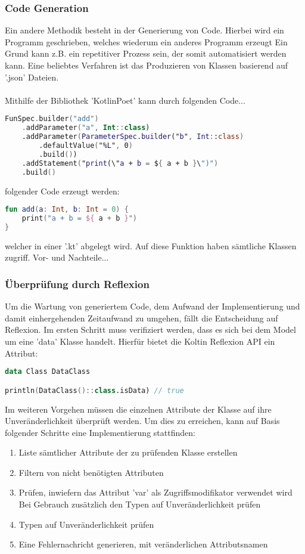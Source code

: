 \subsubsection{Code Generation}
Ein andere Methodik besteht in der Generierung von Code. Hierbei wird ein Programm geschrieben, welches wiederum ein anderes Programm erzeugt Ein Grund kann z.B. ein repetitiver Prozess sein, der somit automatisiert werden kann. Eine beliebtes Verfahren ist das Produzieren von Klassen basierend auf '.json' Dateien.
\\
\\
Mithilfe der Bibliothek 'KotlinPoet' kann durch folgenden Code...
\begin{lstlisting}[caption={Code zum erezugen einer Funktion}, label={lst:data-class}, language=Kotlin]
FunSpec.builder("add")
	.addParameter("a", Int::class)
	.addParameter(ParameterSpec.builder("b", Int::class)
		.defaultValue("%L", 0)
		.build())
	.addStatement("print(\"a + b = ${ a + b }\")")
	.build()
\end{lstlisting}
\bigskip
folgender Code erzeugt werden:
\begin{lstlisting}[caption={Erzeugte Funktionen}, label={lst:data-class}, language=Kotlin]
fun add(a: Int, b: Int = 0) {
	print("a + b = ${ a + b }")
}
\end{lstlisting}
welcher in einer '.kt' abgelegt wird. Auf diese Funktion haben sämtliche Klassen zugriff.
Vor- und Nachteile...
\subsubsection{Überprüfung durch Reflexion}
Um die Wartung von generiertem Code, dem Aufwand der Implementierung und damit einhergehenden Zeitaufwand zu umgehen, fällt die Entscheidung auf Reflexion. Im ersten Schritt muss verifiziert werden, dass es sich bei dem Model um eine 'data' Klasse handelt. Hierfür bietet die Koltin Reflexion API ein Attribut:
\begin{lstlisting}[caption={Kotlin 'isData' Attribut}, label={lst:data-class}, language=Kotlin]
data Class DataClass

println(DataClass()::class.isData) // true
\end{lstlisting}
\bigskip
Im weiteren Vorgehen müssen die einzelnen Attribute der Klasse auf ihre Unveränderlichkeit überprüft werden. Um dies zu erreichen, kann auf Basis folgender Schritte eine Implementierung stattfinden:
\begin{enumerate}
	\item Liste sämtlicher Attribute der zu prüfenden Klasse erstellen
	\item Filtern von nicht benötigten Attributen
	\item Prüfen, inwiefern das Attribut 'var' als Zugriffsmodifikator verwendet wird
	\subitem Bei Gebrauch zusätzlich den Typen auf Unveränderlichkeit prüfen
	\item Typen auf Unveränderlichkeit prüfen
	\item Eine Fehlernachricht generieren, mit veränderlichen Attributsnamen
\end{enumerate}

